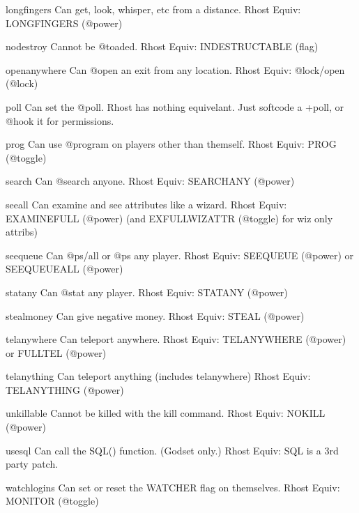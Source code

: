 \documentclass[letterpaper,10pt,english]{sphinxmanual}
\begin{document}
\begin{sphinxVerbatim}[commandchars=\\\{\}]
long\PYGZus{}fingers          Can get, look, whisper, etc from a distance.
Rhost Equiv: LONG\PYGZus{}FINGERS (@power)

no\PYGZus{}destroy            Cannot be @toad\PYGZsq{}ed.
Rhost Equiv: INDESTRUCTABLE (flag)

open\PYGZus{}anywhere         Can @open an exit from any location.
Rhost Equiv: @lock/open (@lock)

poll                  Can set the @poll.
Rhost has nothing equivelant.  Just softcode a +poll, or @hook it for permissions.

prog                  Can use @program on players other than themself.
Rhost Equiv: PROG (@toggle)

search                Can @search anyone.
Rhost Equiv: SEARCH\PYGZus{}ANY (@power)

see\PYGZus{}all               Can examine and see attributes like a wizard.
Rhost Equiv: EXAMINE\PYGZus{}FULL (@power) (and EXFULLWIZATTR (@toggle) for wiz only attribs)

see\PYGZus{}queue             Can @ps/all or @ps any player.
Rhost Equiv: SEE\PYGZus{}QUEUE (@power) or SEE\PYGZus{}QUEUE\PYGZus{}ALL (@power)

stat\PYGZus{}any              Can @stat any player.
Rhost Equiv: STAT\PYGZus{}ANY (@power)

steal\PYGZus{}money           Can give negative money.
Rhost Equiv: STEAL (@power)

tel\PYGZus{}anywhere          Can teleport anywhere.
Rhost Equiv: TEL\PYGZus{}ANYWHERE (@power) or FULL\PYGZus{}TEL (@power)

tel\PYGZus{}anything          Can teleport anything (includes tel\PYGZus{}anywhere)
Rhost Equiv: TEL\PYGZus{}ANYTHING (@power)

unkillable            Cannot be killed with the \PYGZsq{}kill\PYGZsq{} command.
Rhost Equiv: NOKILL (@power)

use\PYGZus{}sql               Can call the SQL() function. (God\PYGZhy{}set only.)
Rhost Equiv: SQL is a 3rd party patch.

watch\PYGZus{}logins          Can set or reset the WATCHER flag on themselves.
Rhost Equiv: MONITOR (@toggle)
\end{sphinxVerbatim}
\end{document}
